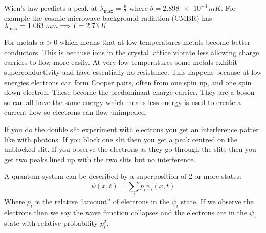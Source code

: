 Wien's law predicts a peak at \(\lambda_{\mathrm{max}}=\frac{b}{T}\) where \(b=\num{2.898e-3}\,\si{m K}\). For example the cosmic microwave background radiation (CMBR) has \(\lambda_{\mathrm{max}}=\SI{1.063}{mm}\implies T=\SI{2.73}{K}\)

For metals \(\alpha>0\) which means that at low temperatures metals become better conductors. This is because ions in the crystal lattice vibrate less allowing charge carriers to flow more easily. At very low temperatures some metals exhibit superconductivity and have essentially no resistance. This happens because at low energies electrons can form Cooper pairs, often from one spin up, and one spin down electron. These become the predominant charge carrier. They are a boson so can all have the same energy which means less energy is used to create a current flow so electrons can flow unimpeded.

If you do the double slit experiment with electrons you get an interference patter like with photons. If you block one slit then you get a peak centred on the unblocked slit. If you observe the electrons as they go through the slits then you get two peaks lined up with the two slits but no interference.

A quantum system can be described by a superposition of 2 or more states:
\[\psi(x,t)=\sum_i p_i\psi_i(x,t)\]
Where \(p_i\) is the relative ``amount'' of electrons in the \(\psi_i\) state. If we observe the electrons then we say the wave function collapses and the electrons are in the \(\psi_i\) state with relative probability \(p_i^2\).